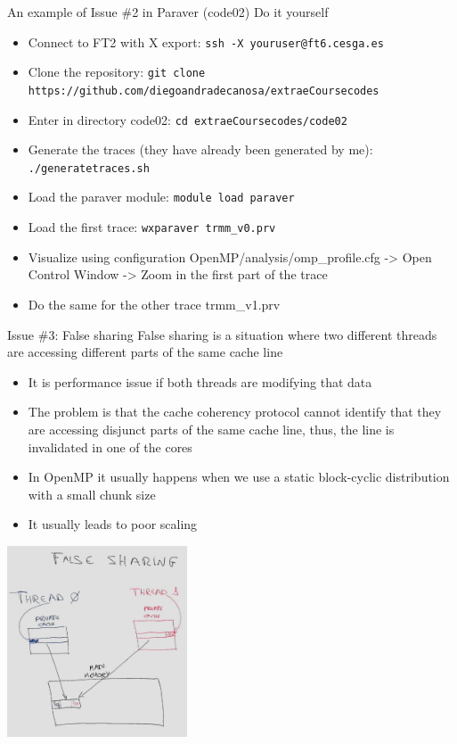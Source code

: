 \documentclass[10pt,xcolor=table]{beamer}
\begin{document}
\begin{frame}{An example of Issue \#2 in Paraver (code02)}
Do it yourself
\begin{itemize}
    \item Connect to FT2 with X export: {\tt ssh -X youruser@ft6.cesga.es}
    \item Clone the repository: {\tt git clone https://github.com/diegoandradecanosa/extraeCoursecodes}
    \item Enter in directory code02: {\tt cd extraeCoursecodes/code02}
    \item Generate the traces (they have already been generated by me): {\tt ./generatetraces.sh}
    \item Load the paraver module:  {\tt module load paraver}
    \item Load the first trace: {\tt wxparaver trmm\_v0.prv}
    \item Visualize using configuration OpenMP/analysis/omp\_profile.cfg -> Open Control Window -> Zoom in the first part of the trace
    \item Do the same for the other trace trmm\_v1.prv
\end{itemize}
\end{frame}


\begin{frame}{Issue \#3: False sharing}
False sharing is a situation where two different threads are accessing different  parts of the same cache line
\begin{itemize}
    \footnotesize
    \item It is performance issue if both threads are modifying that data
    \item The problem is that the cache coherency protocol cannot identify that they are accessing disjunct parts of the same cache line, thus, the line is invalidated in one of the cores
    \item In OpenMP it usually happens when we use a static block-cyclic distribution with a small chunk size
    \item It usually leads to poor scaling
\end{itemize}
\centering
\includegraphics[width=0.4\textwidth]{figs/myfalsesharing.jpg}
\end{frame}
\end{document}
